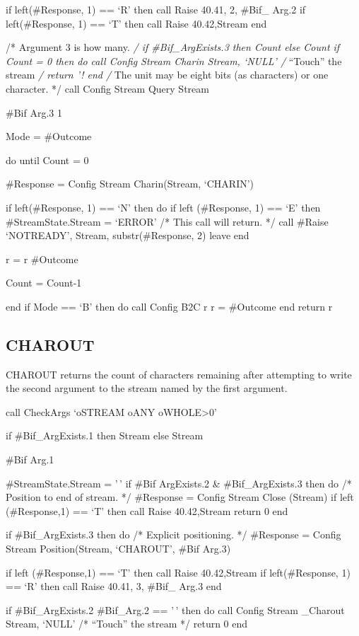 if left(\#Response, 1) == `R' then call Raise 40.41, 2, \#Bif\_ Arg.2 if
left(\#Response, 1) == `T' then call Raise 40.42,Stream end

/* Argument 3 is how many. \emph{/ if \#Bif\_ArgExists.3 then Count else
Count if Count = 0 then do call Config Stream Charin Stream, `NULL' /}
``Touch'' the stream \emph{/ return '! end /} The unit may be eight bits
(as characters) or one character. */ call Config Stream Query Stream

\#Bif Arg.3 1

Mode = \#Outcome

do until Count = 0

\#Response = Config Stream Charin(Stream, `CHARIN')

if left(\#Response, 1) == `N' then do if left (\#Response, 1) == `E'
then \#StreamState.Stream = `ERROR' /* This call will return. */ call
\#Raise `NOTREADY', Stream, substr(\#Response, 2) leave end

r = r\textbar{} \textbar\#Outcome

Count = Count-1

end if Mode == `B' then do call Config B2C r r = \#Outcome end return r

\hypertarget{charout}{%
\subsection{CHAROUT}\label{charout}}

CHAROUT returns the count of characters remaining after attempting to
write the second argument to the stream named by the first argument.

call CheckArgs `oSTREAM oANY oWHOLE\textgreater0'

if \#Bif\_ArgExists.1 then Stream else Stream

\#Bif Arg.1

\#StreamState.Stream = '\,' if \#Bif ArgExists.2 \& \#Bif\_ArgExists.3
then do /* Position to end of stream. */ \#Response = Config Stream
Close (Stream) if left (\#Response,1) == `T' then call Raise
40.42,Stream return 0 end

if \#Bif\_ArgExists.3 then do /* Explicit positioning. */ \#Response =
Config Stream Position(Stream, `CHAROUT', \#Bif Arg.3)

if left (\#Response,1) == `T' then call Raise 40.42,Stream if
left(\#Response, 1) == `R' then call Raise 40.41, 3, \#Bif\_ Arg.3 end

if \#Bif\_ArgExists.2 \textbar{} \#Bif\_Arg.2 == '\,' then do call
Config Stream \_Charout Stream, `NULL' /* ``Touch'' the stream */ return
0 end

